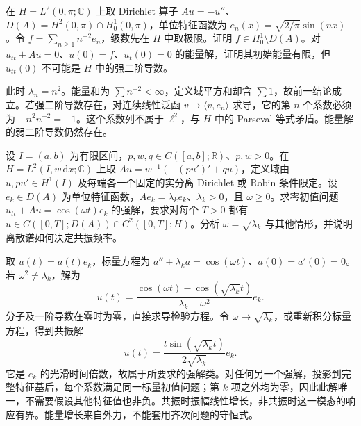 \begin{exercise}\label{b2:ex:10-energy-not-strong}
在 \(H=L^2(0,\pi;\mathbb C)\) 上取 Dirichlet 算子 \(Au=-u''\)、\(D(A)=H^2(0,\pi)\cap H_0^1(0,\pi)\)，单位特征函数为 \(e_n(x)=\sqrt{2/\pi}\sin(nx)\)。令 \(f=\sum_{n\geq1}n^{-2}e_n\)，级数先在 \(H\) 中取极限。证明 \(f\in H_0^1\setminus D(A)\)。对 \(u_{tt}+Au=0\)、\(u(0)=f\)、\(u_t(0)=0\) 的能量解，证明其初始能量有限，但 \(u_{tt}(0)\) 不可能是 \(H\) 中的强二阶导数。
\end{exercise}
\begin{solution}
此时 \(\lambda_n=n^2\)。能量和为 \(\sum n^{-2}<\infty\)，定义域平方和却含 \(\sum1\)，故前一结论成立。若强二阶导数存在，对连续线性泛函 \(v\mapsto\langle v,e_n\rangle\) 求导，它的第 \(n\) 个系数必须为 \(-n^2n^{-2}=-1\)。这个系数列不属于 \(\ell^2\)，与 \(H\) 中的 Parseval 等式矛盾。能量解的弱二阶导数仍然存在。
\end{solution}

\begin{exercise}\label{b2:ex:10-forced-mode}
设 \(I=(a,b)\) 为有限区间，\(p,w,q\in C([a,b];\mathbb R)\)、\(p,w>0\)。在 \(H=L^2(I,w\,\mathrm dx;\mathbb C)\) 上取 \(Au=w^{-1}(-(pu')'+qu)\)，定义域由 \(u,pu'\in H^1(I)\) 及每端各一个固定的实分离 Dirichlet 或 Robin 条件限定。设 \(e_k\in D(A)\) 为单位特征函数，\(Ae_k=\lambda_ke_k\)、\(\lambda_k>0\)，且 \(\omega\geq0\)。求零初值问题 \(u_{tt}+Au=\cos(\omega t)e_k\) 的强解，要求对每个 \(T>0\) 都有 \(u\in C([0,T];D(A))\cap C^2([0,T];H)\)。分析 \(\omega=\sqrt{\lambda_k}\) 与其他情形，并说明离散谱如何决定共振频率。
\end{exercise}
\begin{solution}
取 \(u(t)=a(t)e_k\)，标量方程为 \(a''+\lambda_ka=\cos(\omega t)\)、\(a(0)=a'(0)=0\)。若 \(\omega^2\ne\lambda_k\)，解为
\[
 u(t)=\dfrac{\cos(\omega t)-\cos(\sqrt{\lambda_k}t)}{\lambda_k-\omega^2}e_k.
\]
分子及一阶导数在零时为零，直接求导检验方程。令 \(\omega\to\sqrt{\lambda_k}\)，或重新积分标量方程，得到共振解
\[
 u(t)=\dfrac{t\sin(\sqrt{\lambda_k}t)}{2\sqrt{\lambda_k}}e_k.
\]
它是 \(e_k\) 的光滑时间倍数，故属于所要求的强解类。对任何另一个强解，投影到完整特征基后，每个系数满足同一标量初值问题；第 \(k\) 项之外均为零，因此此解唯一，不需要假设其他特征值也非负。共振时振幅线性增长，非共振时这一模态的响应有界。能量增长来自外力，不能套用齐次问题的守恒式。
\end{solution}
